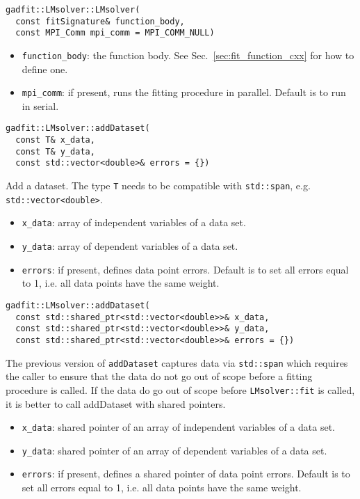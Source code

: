 \documentclass{article}
\begin{document}
\begin{verbatim}
gadfit::LMsolver::LMsolver(
  const fitSignature& function_body,
  const MPI_Comm mpi_comm = MPI_COMM_NULL)
\end{verbatim}
\begin{itemize}
\item \verb+function_body+: the function body. See Sec.~\ref{sec:fit_function_cxx} for how to define one.
\item \verb+mpi_comm+: if present, runs the fitting procedure in parallel. Default is to run in serial.
\end{itemize}

\begin{verbatim}
gadfit::LMsolver::addDataset(
  const T& x_data,
  const T& y_data,
  const std::vector<double>& errors = {})
\end{verbatim}
Add a dataset. The type \texttt{T} needs to be compatible with \texttt{std::span}, e.g. \texttt{std::vector<double>}.
\begin{itemize}
\item \verb+x_data+: array of independent variables of a data set.
\item \verb+y_data+: array of dependent variables of a data set.
\item \verb+errors+: if present, defines data point errors. Default is to set all errors equal to 1, i.e. all data points have the same weight.
\end{itemize}

\begin{verbatim}
gadfit::LMsolver::addDataset(
  const std::shared_ptr<std::vector<double>>& x_data,
  const std::shared_ptr<std::vector<double>>& y_data,
  const std::shared_ptr<std::vector<double>>& errors = {})
\end{verbatim}
The previous version of \texttt{addDataset} captures data via \texttt{std::span} which requires the caller to ensure that the data do not go out of scope before a fitting procedure is called. If the data do go out of scope before \texttt{LMsolver::fit} is called, it is better to call addDataset with shared pointers.
\begin{itemize}
\item \verb+x_data+: shared pointer of an array of independent variables of a data set.
\item \verb+y_data+: shared pointer of an array of dependent variables of a data set.
\item \verb+errors+: if present, defines a shared pointer of data point errors. Default is to set all errors equal to 1, i.e. all data points have the same weight.
\end{itemize}
\end{document}
